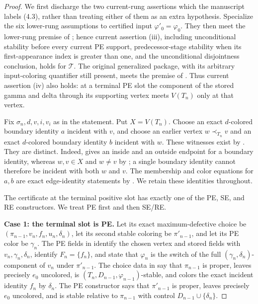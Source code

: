 \begin{proof}
We first discharge the two current-rung assertions which the manuscript
labels (4.3), rather than treating either of them as an extra hypothesis.
Specialize the six lower-rung assumptions to certified input
\(\varphi'_0=\varphi_0\). They then meet the lower-rung premise of
; hence current assertion (iii), including
unconditional stability before every current PE support, predecessor-stage
stability when its first-appearance index is greater than one, and the
unconditional disjointness conclusion, holds for \(\mathcal T\). The original generalized package,
with its arbitrary input-coloring quantifier still present, meets the
premise of . Thus current assertion (iv) also
holds: at a terminal PE slot the component of the stored gamma and delta
through its supporting vertex meets \(V(T_n)\) only at that vertex.

Fix \(\sigma_n,d,v,i,v_i\) as in the statement. Put \(X=V(T_n)\).
Choose an exact \(d\)-colored boundary identity \(a\) incident with \(v\),
and choose an earlier vertex \(w\prec_{T_n}v\) and an exact
\(d\)-colored boundary identity \(b\) incident with \(w\). These
witnesses exist by . They are distinct.
Indeed,  gives an inside and an outside endpoint
for a boundary identity, whereas \(w,v\in X\) and \(w\ne v\) by
; a single boundary identity cannot therefore
be incident with both \(w\) and \(v\). The membership and color equations
for \(a,b\) are exact edge-identity statements by
. We retain these identities throughout.

The certificate  at the terminal positive
slot has exactly one of the PE, SE, and RE constructors. We treat PE
first and then SE/RE.

\textbf{Case 1: the terminal slot is PE.}
Let its exact maximum-defective choice be
\((\pi_{n-1},v_n,f_n,u_n,\delta_n)\), let its second stable coloring be
\(\pi'_{n-1}\), and let its PE color be \(\gamma_n\). The PE fields in
 identify the chosen vertex and stored fields
with \(v_n,\gamma_n,\delta_n\), identify \(F_n=\{f_n\}\), and state that
\(\varphi_n\) is the switch of the full
\((\gamma_n,\delta_n)\)-component of \(v_n\) under
\(\pi'_{n-1}\). The choice data in
 say that \(\pi_{n-1}\) is proper,
leaves precisely \(e_0\) uncolored, is
\((T_n,D_{n-1},\varphi_{n-1})\)-stable, and colors the exact incident
identity \(f_n\) by \(\delta_n\). The PE constructor says that
\(\pi'_{n-1}\) is proper, leaves precisely \(e_0\) uncolored, and is
stable relative to \(\pi_{n-1}\) with control
\(D_{n-1}\cup\{\delta_n\}\).


\end{proof}
